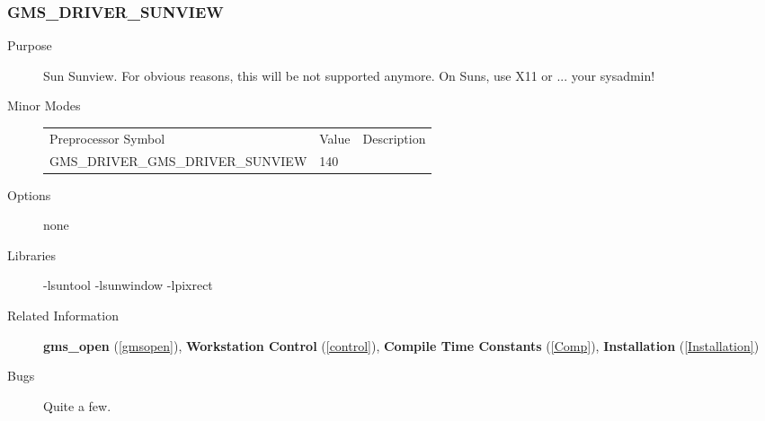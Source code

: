 \subsubsection{GMS\_DRIVER\_SUNVIEW\label{sunview}}
\begin{description}
\item[Purpose]\mbox{}


Sun Sunview. For obvious reasons, this will be not 
supported anymore. On Suns, use X11 or ... your sysadmin!
\item[Minor Modes]\mbox{}


\begin{center}
\begin{tabular}{lll}\hline
Preprocessor Symbol & Value& Description\\ 
GMS\_DRIVER\_GMS\_DRIVER\_SUNVIEW & 140 & \\ 
\hline\end{tabular}
\end{center}

\item[Options]\mbox{}


none
\item[Libraries]\mbox{}


-lsuntool -lsunwindow -lpixrect
\item[Related Information]\mbox{}


{\bf gms\_open} (\ref{gmsopen}), 
{\bf Workstation Control} (\ref{control}), 
{\bf Compile Time Constants} (\ref{Comp}), 
{\bf Installation} (\ref{Installation}) 
\item[Bugs]\mbox{}


Quite a few.
\end{description}



\newpage



